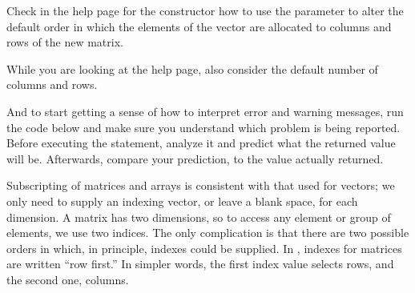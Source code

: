\documentclass[krantz2]{krantz}\usepackage{knitr}
\begin{document}
\begin{playground}
Check in the help page for the  constructor how to use the  parameter to alter the default order in which the elements of the vector are allocated to columns and rows of the new matrix.

\begin{knitrout}\footnotesize
{}\color{fgcolor}\begin{kframe}
\begin{alltt}
\end{alltt}
\end{kframe}
\end{knitrout}

While you are looking at the help page, also consider the default number of columns and rows.

\begin{knitrout}\footnotesize
{}\color{fgcolor}\begin{kframe}
\begin{alltt}
\hlstd{(}\hlopt{:}\hlstd{)}
\end{alltt}
\end{kframe}
\end{knitrout}

And to start getting a sense of how to interpret error and warning messages, run the code below and make sure you understand which problem is being reported. Before executing the statement, analyze it and predict what the returned value will be. Afterwards, compare your prediction, to the value actually returned.

\begin{knitrout}\footnotesize
{}\color{fgcolor}\begin{kframe}
\begin{alltt}
\hlstd{(}\hlopt{:}\hlstd{,}  \hlstd{=} \hlstd{)}
\end{alltt}
\end{kframe}
\end{knitrout}

\end{playground}

Subscripting of matrices and arrays is consistent with that used for vectors; we only need to supply an indexing vector, or leave a blank space, for each dimension. A matrix has two dimensions, so to access any element or group of elements, we use two indices. The only complication is that there are two possible orders in which, in principle, indexes could be supplied. In \Rlang, indexes for matrices are written ``row first.'' In simpler words, the first index value selects rows, and the second one, columns.
\end{document}
